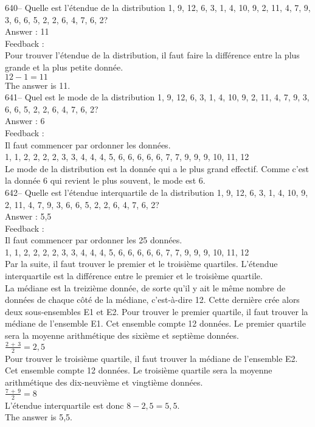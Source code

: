 ﻿\documentclass[letterpaper, 12pt]{article}
\begin{document}
640-- Quelle est l'\'etendue de la distribution 1, 9, 12, 6, 3, 1, 4, 10, 9,
2, 11, 4, 7, 9, 3, 6, 6, 5, 2, 2, 6, 4, 7, 6, 2?\\

Answer : 11\\

Feedback : \\
Pour trouver l'\'etendue de la distribution, il faut faire la diff\'erence
entre la plus grande et la plus petite donn\'ee.  \\
$12-1=11$\\
The answer is 11.\\

641-- Quel est le mode de la distribution 1, 9, 12, 6, 3, 1, 4, 10, 9, 2,
11, 4, 7, 9, 3, 6, 6, 5, 2, 2, 6, 4, 7, 6, 2?\\

Answer : 6\\

Feedback : \\
Il faut commencer par ordonner les donn\'ees.\\
1, 1, 2, 2, 2, 2, 3, 3, 4, 4, 4, 5, 6, 6, 6, 6, 6, 7, 7, 9, 9, 9, 10, 11,
12\\
Le mode de la distribution est la donn\'ee qui a le plus grand effectif.
Comme c'est la donn\'ee 6 qui revient le plus souvent, le mode est 6.\\


642--  Quelle est l'\'etendue interquartile de la distribution 1, 9, 12, 6,
3, 1, 4, 10, 9, 2, 11, 4, 7, 9, 3, 6, 6, 5, 2, 2, 6, 4, 7, 6, 2?\\

Answer : 5,5\\

Feedback : \\
Il faut commencer par ordonner les 25 donn\'ees.\\
1, 1, 2, 2, 2, 2, 3, 3, 4, 4, 4, 5, 6, 6, 6, 6, 6, 7, 7, 9, 9, 9, 10, 11,
12\\
Par la suite, il faut trouver le premier et le troisi\`eme quartiles.
L'\'etendue interquartile est la diff\'erence entre le premier et le
troisi\`eme quartile.\\
La m\'ediane est la treizi\`eme donn\'ee, de sorte qu'il y ait le m\^eme
nombre de donn\'ees de chaque c\^ot\'e de la m\'ediane, c'est-\`a-dire 12.
Cette derni\`ere cr\'ee alors deux sous-ensembles E1 et E2.  Pour trouver le
premier quartile, il faut trouver la m\'ediane de l'ensemble E1.  Cet
ensemble compte 12 donn\'ees.  Le premier quartile sera la moyenne
arithm\'etique des sixi\`eme et septi\`eme donn\'ees. \\[2mm]
$\frac{2\,+\,3}{2}=2,5$\\[2mm]
Pour trouver le troisi\`eme quartile, il faut trouver la m\'ediane de
l'ensemble E2.  Cet ensemble compte 12 donn\'ees.  Le troisi\`eme quartile
sera la moyenne arithm\'etique des dix-neuvi\`eme et vingti\`eme donn\'ees.
\\[2mm]
$\frac{7\,+\,9}{2}=8$\\[2mm]
L'\'etendue interquartile est donc $8-2,5=5,5$.\\[2mm]
The answer is 5,5.\\
\end{document}
